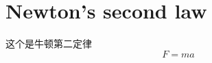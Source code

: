 \documentclass{article}
\begin{document}
\section{Newton's second law}
这个是牛顿第二定律
    $$
    F=ma
    $$
\end{document}
